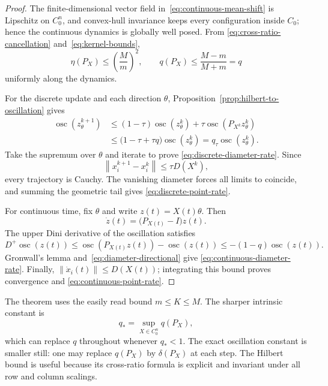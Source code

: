 \documentclass[11pt]{article}
\theoremstyle{definition}
\newcommand{\osc}{\operatorname{osc}}
\newcommand{\norm}[1]{\left\lVert #1\right\rVert}
\begin{document}
\begin{proof}
The finite-dimensional vector field in~\eqref{eq:continuous-mean-shift} is
Lipschitz on $C_0^n$, and convex-hull invariance keeps every configuration
inside $C_0$; hence the continuous dynamics is globally well posed.  From
\eqref{eq:cross-ratio-cancellation} and~\eqref{eq:kernel-bounds},
\begin{equation*}
  \eta(P_X)\leq\left(\frac{M}{m}\right)^2,
  \qquad
  q(P_X)\leq\frac{M-m}{M+m}=q
\end{equation*}
uniformly along the dynamics.

For the discrete update and each direction $\theta$,
Proposition~\ref{prop:hilbert-to-oscillation} gives
\begin{align*}
  \osc(z_\theta^{k+1})
  &\leq
  (1-\tau)\osc(z_\theta^k)
  +\tau\osc(P_{X^k}z_\theta^k) \\
  &\leq
  \bigl(1-\tau+\tau q\bigr)\osc(z_\theta^k)
  =q_\tau\osc(z_\theta^k).
\end{align*}
Take the supremum over $\theta$ and iterate to prove
\eqref{eq:discrete-diameter-rate}.  Since
\begin{equation*}
  \norm{x_i^{k+1}-x_i^k}\leq\tau D(X^k),
\end{equation*}
every trajectory is Cauchy.  The vanishing diameter forces all limits to
coincide, and summing the geometric tail gives
\eqref{eq:discrete-point-rate}.

For continuous time, fix $\theta$ and write
$z(t)=X(t)\theta$.  Then
\begin{equation*}
  \dot z(t)=\bigl(P_{X(t)}-I\bigr)z(t).
\end{equation*}
The upper Dini derivative of the oscillation satisfies
\begin{equation*}
  D^+\osc(z(t))
  \leq
  \osc(P_{X(t)}z(t))-\osc(z(t))
  \leq
  -(1-q)\osc(z(t)).
\end{equation*}
Gronwall's lemma and~\eqref{eq:diameter-directional} give
\eqref{eq:continuous-diameter-rate}.  Finally,
$\norm{\dot x_i(t)}\leq D(X(t))$; integrating this bound proves convergence and
\eqref{eq:continuous-point-rate}.
\end{proof}

The theorem uses the easily read bound $m\leq K\leq M$.  The sharper intrinsic
constant is
\begin{equation}\label{eq:sharp-projective-factor}
  q_*
  =
  \sup_{X\in C_0^n}q(P_X),
\end{equation}
which can replace $q$ throughout whenever $q_*<1$.  The exact oscillation
constant is smaller still: one may replace $q(P_X)$ by $\delta(P_X)$ at each
step.  The Hilbert bound is useful because its cross-ratio formula is explicit
and invariant under all row and column scalings.
\end{document}
